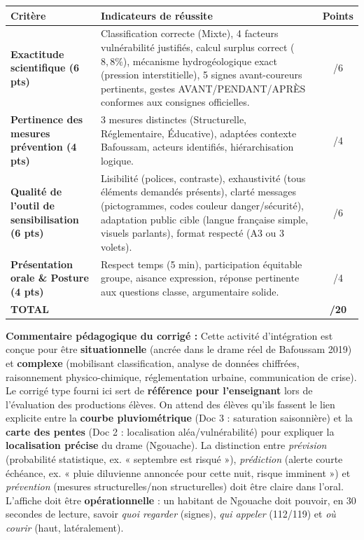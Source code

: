 \documentclass[11pt]{article}
\begin{document}
\begin{exoresolu}
\begin{center}
\begin{tabularx}{\linewidth}{|l|X|c|}\hline
\rowcolor{popblueL}
\textbf{Critère} & \textbf{Indicateurs de réussite} & \textbf{Points} \\ \hline
\textbf{Exactitude scientifique (6 pts)} & Classification correcte (Mixte), 4 facteurs vulnérabilité justifiés, calcul surplus correct ($8,8\%$), mécanisme hydrogéologique exact (pression interstitielle), 5 signes avant-coureurs pertinents, gestes AVANT/PENDANT/APRÈS conformes aux consignes officielles. & /6 \\ \hline
\textbf{Pertinence des mesures prévention (4 pts)} & 3 mesures distinctes (Structurelle, Réglementaire, Éducative), adaptées contexte Bafoussam, acteurs identifiés, hiérarchisation logique. & /4 \\ \hline
\textbf{Qualité de l'outil de sensibilisation (6 pts)} & Lisibilité (polices, contraste), exhaustivité (tous éléments demandés présents), clarté messages (pictogrammes, codes couleur danger/sécurité), adaptation public cible (langue française simple, visuels parlants), format respecté (A3 ou 3 volets). & /6 \\ \hline
\textbf{Présentation orale \& Posture (4 pts)} & Respect temps (5 min), participation équitable groupe, aisance expression, réponse pertinente aux questions classe, argumentaire solide. & /4 \\ \hline
\textbf{TOTAL} & & \textbf{/20} \\ \hline
\end{tabularx}
\end{center}
\tcblower
\textbf{Commentaire pédagogique du corrigé :}
Cette activité d'intégration est conçue pour être \textbf{situationnelle} (ancrée dans le drame réel de Bafoussam 2019) et \textbf{complexe} (mobilisant classification, analyse de données chiffrées, raisonnement physico-chimique, réglementation urbaine, communication de crise). Le corrigé type fourni ici sert de \textbf{référence pour l'enseignant} lors de l'évaluation des productions élèves. On attend des élèves qu'ils fassent le lien explicite entre la \textbf{courbe pluviométrique} (Doc 3 : saturation saisonnière) et la \textbf{carte des pentes} (Doc 2 : localisation aléa/vulnérabilité) pour expliquer la \textbf{localisation précise} du drame (Ngouache). La distinction entre \emph{prévision} (probabilité statistique, ex. « septembre est risqué »), \emph{prédiction} (alerte courte échéance, ex. « pluie diluvienne annoncée pour cette nuit, risque imminent ») et \emph{prévention} (mesures structurelles/non structurelles) doit être claire dans l'oral. L'affiche doit être \textbf{opérationnelle} : un habitant de Ngouache doit pouvoir, en 30 secondes de lecture, savoir \emph{quoi regarder} (signes), \emph{qui appeler} (112/119) et \emph{où courir} (haut, latéralement).
\end{exoresolu}
\end{document}
